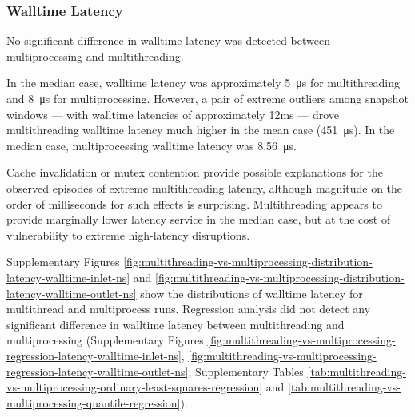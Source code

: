 \subsubsection{Walltime Latency}

No significant difference in walltime latency was detected between multiprocessing and multithreading.

In the median case, walltime latency was approximately \SI{5}{\micro\second} for multithreading and \SI{8}{\micro\second} for multiprocessing.
However, a pair of extreme outliers among snapshot windows --- with walltime latencies of approximately 12ms --- drove multithreading walltime latency much higher in the mean case (\SI{451}{\micro\second}).
In the median case, multiprocessing walltime latency was \SI{8.56}{\micro\second}.

Cache invalidation or mutex contention provide possible explanations for the observed episodes of extreme multithreading latency, although magnitude on the order of milliseconds for such effects is surprising.
Multithreading appears to provide marginally lower latency service in the median case, but at the cost of vulnerability to extreme high-latency disruptions.

Supplementary Figures \ref{fig:multithreading-vs-multiprocessing-distribution-latency-walltime-inlet-ns} and \ref{fig:multithreading-vs-multiprocessing-distribution-latency-walltime-outlet-ns} show the distributions of walltime latency for multithread and multiprocess runs.
Regression analysis did not detect any significant difference in walltime latency between multithreading and multiprocessing (Supplementary Figures \ref{fig:multithreading-vs-multiprocessing-regression-latency-walltime-inlet-ns}, \ref{fig:multithreading-vs-multiprocessing-regression-latency-walltime-outlet-ns}; Supplementary Tables \ref{tab:multithreading-vs-multiprocessing-ordinary-least-squares-regression} and \ref{tab:multithreading-vs-multiprocessing-quantile-regression}).

